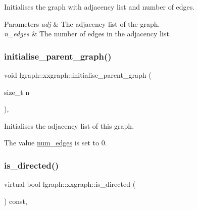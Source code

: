 Initialises the graph with adjacency list and number of edges. 


\begin{DoxyParams}{Parameters}
{\em adj} & The adjacency list of the graph. \\
\hline
{\em n\+\_\+edges} & The number of edges in the adjacency list. \\
\hline
\end{DoxyParams}
\mbox{\label{classlgraph_1_1xxgraph_a50c658dd39e6b1d38bf7e514daa2f33c}} 
\subsubsection{\texorpdfstring{initialise\+\_\+parent\+\_\+graph()}{initialise\_parent\_graph()}}
{\footnotesize\ttfamily void lgraph\+::xxgraph\+::initialise\+\_\+parent\+\_\+graph (\begin{DoxyParamCaption}\item[{size\+\_\+t}]{n }\end{DoxyParamCaption})\hspace{0.3cm}{\ttfamily [protected]}, {\ttfamily [inherited]}}



Initialises the adjacency list of this graph. 

The value \hyperlink{classlgraph_1_1xxgraph_a6765a9a3be42f6e0f824635c593b35d7}{num\+\_\+edges} is set to 0. \mbox{\label{classlgraph_1_1xxgraph_a0a606d77cbbb2efa7056b82c3b8c395c}} 
\subsubsection{\texorpdfstring{is\+\_\+directed()}{is\_directed()}}
{\footnotesize\ttfamily virtual bool lgraph\+::xxgraph\+::is\+\_\+directed (\begin{DoxyParamCaption}{ }\end{DoxyParamCaption}) const\hspace{0.3cm}{\ttfamily [pure virtual]}, {\ttfamily [inherited]}}



